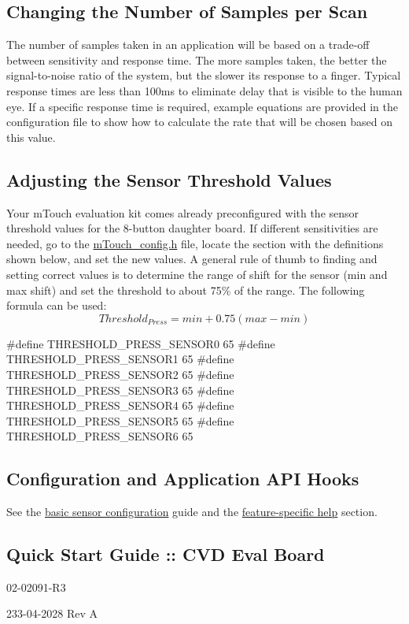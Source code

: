 \hypertarget{_getting_started_eval_GSE_CAC}{}\subsection{Changing the Number of Samples per Scan}\label{_getting_started_eval_GSE_CAC}
The number of samples taken in an application will be based on a trade-\/off between sensitivity and response time. The more samples taken, the better the signal-\/to-\/noise ratio of the system, but the slower its response to a finger. Typical response times are less than 100ms to eliminate delay that is visible to the human eye. If a specific response time is required, example equations are provided in the configuration file to show how to calculate the rate that will be chosen based on this value.\hypertarget{_getting_started_eval_GSE_AST}{}\subsection{Adjusting the Sensor Threshold Values}\label{_getting_started_eval_GSE_AST}
Your m\+Touch evaluation kit comes already preconfigured with the sensor threshold values for the 8-\/button daughter board. If different sensitivities are needed, go to the \hyperlink{m_touch__config_8h}{m\+Touch\+\_\+config.\+h} file, locate the section with the definitions shown below, and set the new values. A general rule of thumb to finding and setting correct values is to determine the range of shift for the sensor (min and max shift) and set the threshold to about 75\% of the range. The following formula can be used\+: \[ Threshold_{Press} = min + 0.75 (max - min) \] 
\begin{DoxyCode}
\textcolor{preprocessor}{#define THRESHOLD\_PRESS\_SENSOR0         65         }
\textcolor{preprocessor}{#define THRESHOLD\_PRESS\_SENSOR1         65}
\textcolor{preprocessor}{#define THRESHOLD\_PRESS\_SENSOR2         65}
\textcolor{preprocessor}{#define THRESHOLD\_PRESS\_SENSOR3         65}
\textcolor{preprocessor}{#define THRESHOLD\_PRESS\_SENSOR4         65}
\textcolor{preprocessor}{#define THRESHOLD\_PRESS\_SENSOR5         65}
\textcolor{preprocessor}{#define THRESHOLD\_PRESS\_SENSOR6         65}
\end{DoxyCode}
\hypertarget{_getting_started_eval_Framework}{}\subsection{Configuration and Application A\+P\+I Hooks}\label{_getting_started_eval_Framework}
See the \hyperlink{featBasic}{basic sensor configuration} guide and the \hyperlink{FrameworkFeatures}{feature-\/specific help} section. \hypertarget{GSE_R3}{}\subsection{Quick Start Guide \+:\+: C\+V\+D Eval Board}\label{GSE_R3}
\begin{DoxyItemize}
\item 02-\/02091-\/\+R3 \item 233-\/04-\/2028 Rev A\end{DoxyItemize}


